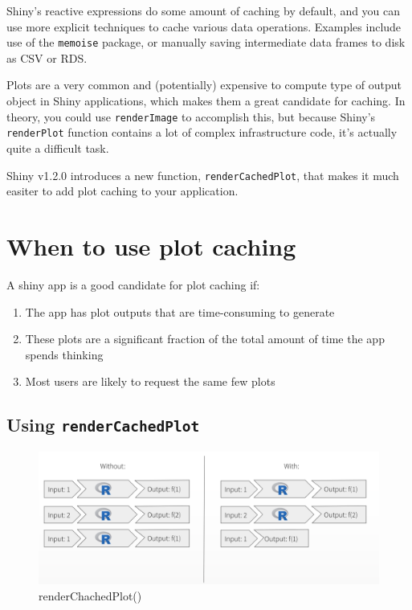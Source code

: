 \documentclass[]{book}
\providecommand{\tightlist}{%
  \setlength{\itemsep}{0pt}\setlength{\parskip}{0pt}}
\theoremstyle{definition}
\theoremstyle{definition}
\theoremstyle{definition}
\theoremstyle{remark}
\begin{document}
Shiny's reactive expressions do some amount of caching by default, and
you can use more explicit techniques to cache various data operations.
Examples include use of the \texttt{memoise} package, or manually saving
intermediate data frames to disk as CSV or RDS.

Plots are a very common and (potentially) expensive to compute type of
output object in Shiny applications, which makes them a great candidate
for caching. In theory, you could use \texttt{renderImage} to accomplish
this, but because Shiny's \texttt{renderPlot} function contains a lot of
complex infrastructure code, it's actually quite a difficult task.

Shiny v1.2.0 introduces a new function, \texttt{renderCachedPlot}, that
makes it much easiter to add plot caching to your application.

\hypertarget{when-to-use-plot-caching}{%
\section{When to use plot caching}\label{when-to-use-plot-caching}}

A shiny app is a good candidate for plot caching if:

\begin{enumerate}
\def\labelenumi{\arabic{enumi}.}
\tightlist
\item
  The app has plot outputs that are time-consuming to generate
\item
  These plots are a significant fraction of the total amount of time the
  app spends thinking
\item
  Most users are likely to request the same few plots
\end{enumerate}

\hypertarget{using-rendercachedplot}{%
\subsection{\texorpdfstring{Using
\texttt{renderCachedPlot}}{Using renderCachedPlot}}\label{using-rendercachedplot}}

\begin{figure}
\centering
\includegraphics{imgs/plotcaching/rendercachedplot.png}
\caption{renderChachedPlot()}
\end{figure}
\end{document}
